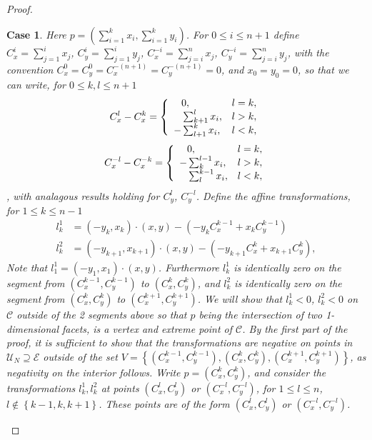 \documentclass{article}
\theoremstyle{case}
\newtheorem{case}{Case}
\begin{document}
\begin{proof}
\begin{case}
Here $p = \left( \sum_{i=1}^k x_i, \sum_{i=1}^k y_i\right)$. For $0 \leq i \leq n+1$ define $C_x^i = \sum_{j=1}^i x_j$, $C_y^i = \sum_{j=1}^i y_j$, $C_x^{-i} = \sum_{j=i}^n x_j$, $C_y^{-i} = \sum_{j=i}^n y_j$, with the convention $C_x^0 = C_y^0 = C_x^{-(n+1)} = C_y^{-(n+1)} = 0$, and $x_0 = y_0 = 0$, so that we can write, for $0  \leq k,l \leq n+1$
\[   
C_x^l - C_x^k = \left\{
\begin{array}{ll}
  \hphantom{-}0, & l = k, \\
  \hphantom{-}\sum_{k+1}^l x_i, & l > k, \\
  -\sum_{l+1}^k x_i, & l < k, \\
\end{array} 
\right. 
\]
\[   
C_x^{-l} - C_x^{-k} = \left\{
\begin{array}{ll}
  \hphantom{-}0, & l = k, \\
  -\sum_k^{l-1} x_i, & l > k, \\
  \hphantom{-}\sum_l^{k-1} x_i, & l < k, \\
\end{array} 
\right. 
\],
with analagous results holding for $C_y^l$, $C_y^{-l}$. Define the affine transformations, for $1 \leq k \leq n-1$
\begin{align*}
l_k^1 &= \left( -y_k, x_k\right) \cdot \left( x,y\right) - \left( -y_kC_x^{k-1} + x_kC_y^{k-1}\right) \\
l_k^2 &= \left( -y_{k+1}, x_{k+1}\right) \cdot \left( x,y\right) - \left( -y_{k+1}C_x^k + x_{k+1}C_y^k\right),
\end{align*}
Note that $l_1^1 = \left( -y_1, x_1\right) \cdot \left( x,y\right)$. Furthermore $l_k^1$ is identically zero on the segment from $\left( C_x^{k-1}, C_y^{k-1}\right)$ to $\left( C_x^k, C_y^k\right)$, and $l_k^2$ is identically zero on the segment from $\left( C_x^k, C_y^k\right)$ to $\left( C_x^{k+1}, C_y^{k+1}\right)$. We will show that $l_k^1 < 0$, $l_k^2 < 0$ on $\mathcal{C}$ outside of the 2 segments above so that $p$ being the intersection of two 1-dimensional facets, is a vertex and extreme point of $\mathcal{C}$. By the first part of the proof, it is sufficient to show that the transformations are negative on points in $\mathcal{U}_N \supseteq \mathcal{E}$ outside of the set  $V = \left\lbrace \left( C_x^{k-1}, C_y^{k-1}\right), \left( C_x^k, C_y^k\right), \left( C_x^{k+1}, C_y^{k+1}\right)\right\rbrace$, as negativity on the interior follows. Write $p = \left( C_x^k, C_y^k\right)$, and consider the transformations $l_k^1, l_k^2$ at points $\left( C_x^l, C_y^l\right)$ or $\left( C_x^{-l}, C_y^{-l}\right)$, for $1 \leq l \leq n$, $l \not \in  \left\lbrace k-1, k, k+1\right\rbrace$. These points are of the form $\left( C_x^l, C_y^l\right)$ or $\left( C_x^{-l}, C_y^{-l}\right)$.


\end{case}
\end{proof}
\end{document}
